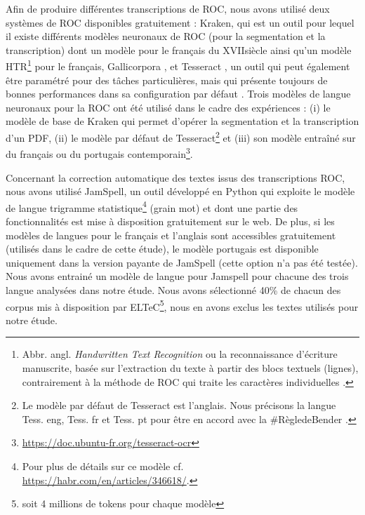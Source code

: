 Afin de produire différentes transcriptions de ROC, nous avons utilisé deux systèmes de ROC disponibles gratuitement : Kraken, qui est un outil pour lequel il existe différents modèles neuronaux de ROC (pour la segmentation et la transcription) dont un modèle pour le français du XVII\ieme{}siècle \cite{gabay:hal-02577236} ainsi qu'un modèle HTR\footnote{Abbr. angl. \textit{Handwritten Text Recognition} ou la reconnaissance d'écriture manuscrite, basée sur l'extraction du texte à partir des blocs textuels (lignes), contrairement à la méthode de ROC qui traite les caractères individuelles \cite{gabayscicos}.} pour le français, Gallicorpora \cite{pinche_2022_7410529}, et Tesseract \cite{smith2007overview}, un outil qui peut également être paramétré pour des tâches particulières, mais qui présente toujours de bonnes performances dans sa configuration par défaut \cite{clausner2020efficient}.
Trois modèles de langue neuronaux pour la ROC ont été utilisé dans le cadre des expériences : (i) le modèle de base de Kraken qui permet d'opérer la segmentation et la transcription d'un PDF, (ii) le modèle par défaut de Tesseract\footnote{Le modèle par défaut de Tesseract est l'anglais. Nous précisons la langue Tess. eng, Tess. fr et Tess. pt pour être en accord avec la \#RègledeBender \cite{bender-friedman-2018-data}.} et (iii) son modèle entraîné sur du français ou du portugais contemporain\footnote{\url{https://doc.ubuntu-fr.org/tesseract-ocr}}.

Concernant la correction automatique des textes issus des transcriptions ROC, nous avons utilisé JamSpell, un outil développé en Python qui exploite le modèle de langue trigramme statistique\footnote{Pour plus de détails sur ce modèle cf. \url{https://habr.com/en/articles/346618/}.} (grain mot) et dont une partie des fonctionnalités est mise à disposition gratuitement sur le web.
De plus, si les modèles de langues pour le français et l'anglais sont accessibles gratuitement (utilisés dans le cadre de cette étude), le modèle portugais est disponible uniquement dans la version payante de JamSpell (cette option n'a pas été testée).
Nous avons entrainé un modèle de langue pour Jamspell pour chacune des trois langue analysées dans notre étude. Nous avons sélectionné 40\% de chacun des corpus mis à disposition par ELTeC\footnote{soit 4 millions de tokens pour chaque modèle}, nous en avons exclus les textes utilisés pour notre étude.

